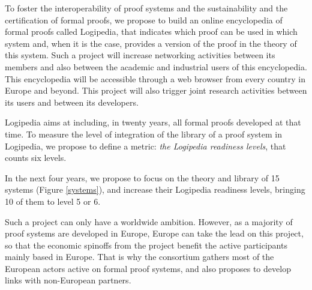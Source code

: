 To foster the interoperability of proof systems and the sustainability
and the certification of formal proofs, we propose to build an online
encyclopedia of formal proofs called {\sc Logipedia}, that indicates
which proof can be used in which system and, when it is the case,
provides a version of the proof in the theory of this system.  Such a
project will increase networking activities between its members and
also between the academic and industrial users of this encyclopedia.
This encyclopedia will be accessible through a web browser from every
country in Europe and beyond. This project will also trigger joint
research activities between its users and between its developers.

{\sc Logipedia} aims at including, in twenty years, all formal proofs
developed at that time. To measure the level of integration of the
library of a proof system in {\sc Logipedia}, we propose to define a
metric: {\em the {\sc Logipedia} readiness levels}, that counts six
levels.

In the next four years, we propose to focus on the theory and library
of 15 systems (Figure \ref{systems}), and increase their {\sc
  Logipedia} readiness levels, bringing 10 of them to level 5 or 6.

Such a project can only have a worldwide ambition. However, as a
majority of proof systems are developed in Europe, Europe can take the
lead on this project, so that the economic spinoffs from the project
benefit the active participants mainly based in Europe.  That is why
the consortium gathers most of the European actors active on formal
proof systems, and also proposes to develop links with non-European
partners.


